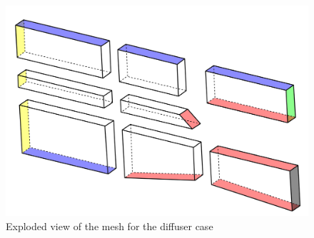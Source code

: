      \begin{figure}[h!]
        \centering
        \includegraphics[width=\textwidth]{Figures/3/diffuserBC.png}
        \caption{Exploded view of the mesh for the diffuser case}
        \label{fig:diffuserBC}
    \end{figure}
    
    
\newpage
    
